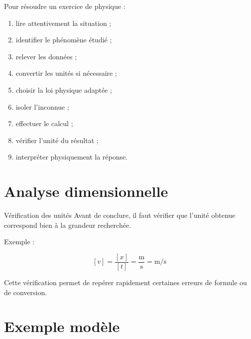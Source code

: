 \documentclass[11pt,a4paper]{article}
\begin{document}
\begin{cadremethode}
Pour résoudre un exercice de physique :

\begin{enumerate}
    \item lire attentivement la situation ;
    \item identifier le phénomène étudié ;
    \item relever les données ;
    \item convertir les unités si nécessaire ;
    \item choisir la loi physique adaptée ;
    \item isoler l’inconnue ;
    \item effectuer le calcul ;
    \item vérifier l’unité du résultat ;
    \item interpréter physiquement la réponse.
\end{enumerate}
\end{cadremethode}

\section{Analyse dimensionnelle}

\begin{cadreorange}{Vérification des unités}
Avant de conclure, il faut vérifier que l’unité obtenue correspond bien à la grandeur recherchée.

\medskip

Exemple :

\[
[v] = \frac{[x]}{[t]} = \frac{\mathrm{m}}{\mathrm{s}} = \mathrm{m/s}
\]

\medskip

Cette vérification permet de repérer rapidement certaines erreurs de formule ou de conversion.
\end{cadreorange}

\section{Exemple modèle}
\end{document}
